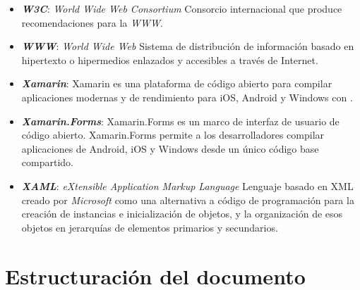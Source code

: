\begin{itemize}
    \item \textbf{\textit{W3C}}: \emph{World Wide Web Consortium} Consorcio 
    internacional que produce recomendaciones para la \emph{WWW}.

    \item \textbf{\textit{WWW}}: \emph{World Wide Web} Sistema de distribución 
    de información basado en hipertexto o hipermedios enlazados y accesibles 
    a través de Internet. 

    \item \textbf{\textit{Xamarin}}: Xamarin es una plataforma de código 
    abierto para compilar aplicaciones modernas y de rendimiento para iOS, 
    Android y Windows con \net.

    \item \textbf{\textit{Xamarin.Forms}}: Xamarin.Forms es un marco de 
    interfaz de usuario de código abierto. Xamarin.Forms permite a los 
    desarrolladores compilar aplicaciones de Android, iOS y Windows 
    desde un único código base compartido.

    \item \textbf{\textit{XAML}}: \emph{eXtensible Application Markup 
    Language} Lenguaje basado en XML creado por \emph{Microsoft} como una 
    alternativa a código de programación para la creación de instancias 
    e inicialización de objetos, y la organización de esos objetos en 
    jerarquías de elementos primarios y secundarios.


\end{itemize}

\section{Estructuración del documento}
\lorem{} %







